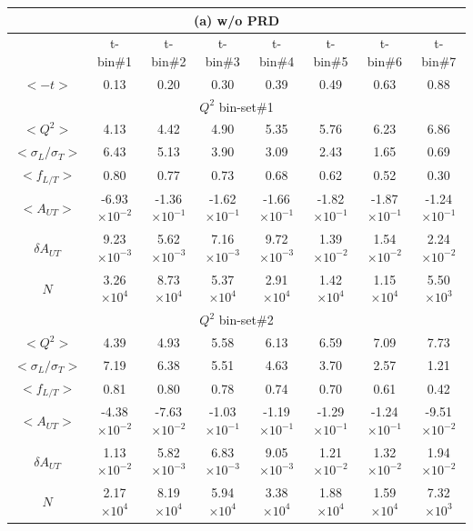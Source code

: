 	\begin{table}[!ht]
	\centering
	  \small
	\begin{tabular}{|c|c|c|c|c|c|c|c|}
	 \multicolumn{8}{c}{ (a) w/o PRD} \\
	  \hline
	      &  t-bin\#1 & t-bin\#2 & t-bin\#3 & t-bin\#4 & t-bin\#5 & t-bin\#6 & t-bin\#7 \\
	\hline 
	    $<-t>$                  &  0.13 &  0.20 & 0.30 & 0.39 & 0.49 & 0.63 & 0.88 \\
	      \hline
   	  \multicolumn{8}{|c|}{$Q^{2}$ bin-set\#1 } \\
   	    \hline
   	   $<Q^{2}>$          &  4.13 &  4.42 & 4.90 & 5.35 & 5.76 & 6.23 & 6.86 \\
   	   $<\sigma_{L}/\sigma_{T}>$   &  6.43 &  5.13 & 3.90 & 3.09 & 2.43 & 1.65 & 0.69 \\
   	   $<f_{L/T}>$          &  0.80 &  0.77 & 0.73 & 0.68 & 0.62 & 0.52 & 0.30 \\
   	   $<A_{UT}>$     &  -6.93$\times 10^{-2}$ &  -1.36$\times 10^{-1}$ & -1.62$\times 10^{-1}$ & -1.66$\times 10^{-1}$ & -1.82$\times 10^{-1}$ & -1.87$\times 10^{-1}$ & -1.24$\times 10^{-1}$ \\               
   	   $\delta A_{UT}$  &  9.23$\times 10^{-3}$ &  5.62$\times 10^{-3}$ & 7.16$\times 10^{-3}$ & 9.72$\times 10^{-3}$ & 1.39$\times 10^{-2}$ & 1.54$\times 10^{-2}$ & 2.24$\times 10^{-2}$ \\
   	   $N$                      &  3.26$\times 10^{4}$ &  8.73$\times 10^{4}$ & 5.37$\times 10^{4}$ & 2.91$\times 10^{4}$ & 1.42$\times 10^{4}$ & 1.15$\times 10^{4}$ & 5.50$\times 10^{3}$ \\
  \hline
   	  \multicolumn{8}{|c|}{$Q^{2}$ bin-set\#2 } \\
  \hline 
   	   $<Q^{2}>$            &  4.39 &  4.93 & 5.58 & 6.13 & 6.59 & 7.09 & 7.73 \\
	   $<\sigma_{L}/\sigma_{T}>$   &  7.19 &  6.38 & 5.51 & 4.63 & 3.70 & 2.57 & 1.21 \\
   	   $<f_{L/T}>$          &  0.81 &  0.80 & 0.78 & 0.74 & 0.70 & 0.61 & 0.42 \\
   	   
   	  $<A_{UT}>$   &  -4.38$\times 10^{-2}$ &  -7.63$\times 10^{-2}$ & -1.03$\times 10^{-1}$ & -1.19$\times 10^{-1}$ & -1.29$\times 10^{-1}$ & -1.24$\times 10^{-1}$ & -9.51$\times 10^{-2}$ \\
  $\delta A_{UT}$   &  1.13$\times 10^{-2}$ &  5.82$\times 10^{-3}$ & 6.83$\times 10^{-3}$ & 9.05$\times 10^{-3}$ & 1.21$\times 10^{-2}$ & 1.32$\times 10^{-2}$ & 1.94$\times 10^{-2}$ \\
   $N$    &  2.17$\times 10^{4}$ &  8.19$\times 10^{4}$ & 5.94$\times 10^{4}$ & 3.38$\times 10^{4}$ & 1.88$\times 10^{4}$ & 1.59$\times 10^{4}$ & 7.32$\times 10^{3}$ \\


\end{tabular}
\end{table}
